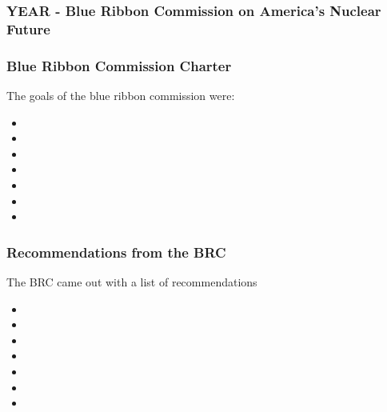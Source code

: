 
\begin{frame}[ctb!]
    \frametitle{YEAR - Blue Ribbon Commission on America's Nuclear Future}
    
  \end{frame}
\begin{frame}[ctb!]
    \frametitle{Blue Ribbon Commission Charter}
    The goals of the blue ribbon commission were:
    \begin{itemize}
      \item <++>
      \item <++>
      \item <++>
      \item <++>
      \item <++>
      \item <++>
      \item <++>
    \end{itemize}

  \end{frame}

\begin{frame}[ctb!]
    \frametitle{Recommendations from the BRC}
    The BRC came out with a list of recommendations
    \begin{itemize}
      \item <++>
      \item <++>
      \item <++>
      \item <++>
      \item <++>
      \item <++>
      \item <++>
    \end{itemize}
  \end{frame}


